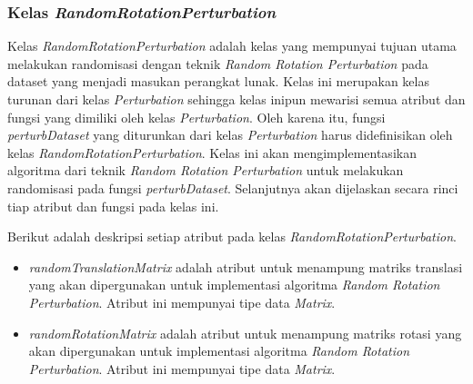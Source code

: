 \subsubsection{Kelas \textit{RandomRotationPerturbation}}
\label{subsubsec:kelas-rrp}

Kelas \textit{RandomRotationPerturbation} adalah kelas yang mempunyai tujuan utama melakukan randomisasi dengan teknik \textit{Random Rotation Perturbation} pada dataset yang menjadi masukan perangkat lunak. Kelas ini merupakan kelas turunan dari kelas \textit{Perturbation} sehingga kelas inipun mewarisi semua atribut dan fungsi yang dimiliki oleh kelas \textit{Perturbation}. Oleh karena itu, fungsi \textit{perturbDataset} yang diturunkan dari kelas \textit{Perturbation} harus didefinisikan oleh kelas \textit{RandomRotationPerturbation}. Kelas ini akan mengimplementasikan algoritma dari teknik \textit{Random Rotation Perturbation} untuk melakukan randomisasi pada fungsi \textit{perturbDataset}. Selanjutnya akan dijelaskan secara rinci tiap atribut dan fungsi pada kelas ini.

Berikut adalah deskripsi setiap atribut pada kelas \textit{RandomRotationPerturbation}.
\begin{itemize}
	\item \textit{randomTranslationMatrix} adalah atribut untuk menampung matriks translasi yang akan dipergunakan untuk implementasi algoritma \textit{Random Rotation Perturbation}. Atribut ini mempunyai tipe data \textit{Matrix}.
	\item \textit{randomRotationMatrix} adalah atribut untuk menampung matriks rotasi yang akan dipergunakan untuk implementasi algoritma \textit{Random Rotation Perturbation}. Atribut ini mempunyai tipe data \textit{Matrix}.
\end{itemize}

